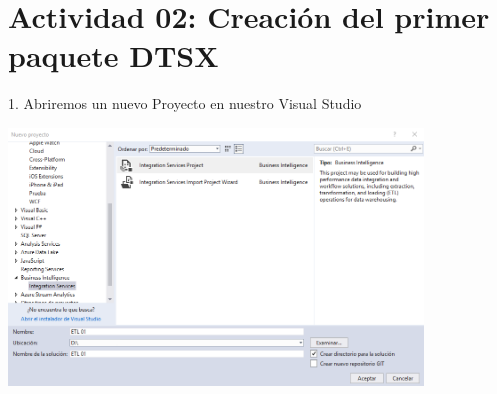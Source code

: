 \section{Actividad 02: Creación del primer paquete DTSX} 


1. Abriremos un nuevo Proyecto en nuestro Visual Studio\\
	\begin{center}
	\includegraphics[width=11cm]{./Imagenes/img13}
	\end{center}	

